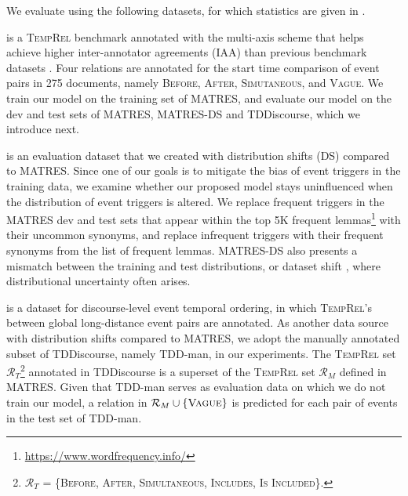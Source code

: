 \documentclass[11pt]{article}
\newcommand{\temprel}{\textsc{TempRel}\xspace}
\newcommand{\stitle}[1]{\vspace{1ex}\noindent{\bf #1}}
\begin{document}
We evaluate using the following datasets, for which statistics are given in .

\label{sec:datasets}
\stitle{MATRES} \cite{ning-etal-2018-multi} is a \temprel benchmark annotated with the multi-axis scheme that helps  achieve higher inter-annotator agreements (IAA) than previous benchmark datasets \cite{cassidy-etal-2014-annotation, styler2014temporal, ogorman-etal-2016-richer}.
Four relations are annotated for the start time comparison of event pairs in 275 documents, namely \textsc{Before}, \textsc{After}, \textsc{Simutaneous}, and \textsc{Vague}.
We train our model on the training set of MATRES, and evaluate our model on the dev and test sets of MATRES, MATRES-DS and TDDiscourse, which we introduce next.

\stitle{MATRES-DS} is an evaluation dataset that we created with distribution shifts (DS) compared to MATRES. 
Since one of our goals is to mitigate the bias of event triggers in the training data, we examine whether our proposed model stays uninfluenced when the distribution of event triggers is altered.
We replace frequent triggers in the MATRES dev and test sets that appear within the top 5K frequent lemmas\footnote{\url{https://www.wordfrequency.info/}} with their uncommon synonyms, and replace infrequent triggers with their frequent synonyms from the list of frequent lemmas.
MATRES-DS also presents a mismatch between the training and test distributions, or dataset shift \cite{quinonero2008dataset}, where distributional uncertainty often arises.

\stitle{TDDiscourse} \cite{naik-etal-2019-tddiscourse} is a dataset for discourse-level event temporal ordering, in which \temprel's between global long-distance event pairs are annotated.
As another data source with distribution shifts 
compared to MATRES, we adopt the manually annotated subset of TDDiscourse, namely TDD-man, in our experiments.
The \temprel set $\mathcal{R}_{T}$\footnote{$\mathcal{R}_{T}$ = \{\textsc{Before}, \textsc{After}, \textsc{Simultaneous}, \textsc{Includes}, \textsc{Is Included}\}.} annotated in TDDiscourse is a superset of the \temprel set $\mathcal{R}_{M}$ defined in MATRES.
Given that TDD-man serves as evaluation data on which we do not train our model, a relation in $\mathcal{R}_{M} \cup \{\textsc{Vague}\}$ is predicted for each pair of events in the test set of TDD-man.
\end{document}
